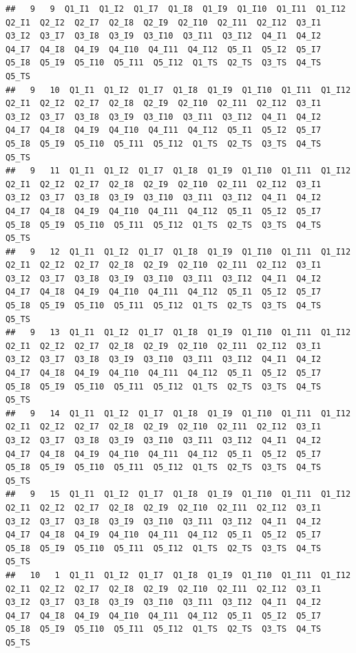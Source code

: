 \documentclass[
]{book}
\begin{document}
\begin{verbatim}
##   9   9  Q1_I1  Q1_I2  Q1_I7  Q1_I8  Q1_I9  Q1_I10  Q1_I11  Q1_I12  Q2_I1  Q2_I2  Q2_I7  Q2_I8  Q2_I9  Q2_I10  Q2_I11  Q2_I12  Q3_I1  Q3_I2  Q3_I7  Q3_I8  Q3_I9  Q3_I10  Q3_I11  Q3_I12  Q4_I1  Q4_I2  Q4_I7  Q4_I8  Q4_I9  Q4_I10  Q4_I11  Q4_I12  Q5_I1  Q5_I2  Q5_I7  Q5_I8  Q5_I9  Q5_I10  Q5_I11  Q5_I12  Q1_TS  Q2_TS  Q3_TS  Q4_TS  Q5_TS
##   9   10  Q1_I1  Q1_I2  Q1_I7  Q1_I8  Q1_I9  Q1_I10  Q1_I11  Q1_I12  Q2_I1  Q2_I2  Q2_I7  Q2_I8  Q2_I9  Q2_I10  Q2_I11  Q2_I12  Q3_I1  Q3_I2  Q3_I7  Q3_I8  Q3_I9  Q3_I10  Q3_I11  Q3_I12  Q4_I1  Q4_I2  Q4_I7  Q4_I8  Q4_I9  Q4_I10  Q4_I11  Q4_I12  Q5_I1  Q5_I2  Q5_I7  Q5_I8  Q5_I9  Q5_I10  Q5_I11  Q5_I12  Q1_TS  Q2_TS  Q3_TS  Q4_TS  Q5_TS
##   9   11  Q1_I1  Q1_I2  Q1_I7  Q1_I8  Q1_I9  Q1_I10  Q1_I11  Q1_I12  Q2_I1  Q2_I2  Q2_I7  Q2_I8  Q2_I9  Q2_I10  Q2_I11  Q2_I12  Q3_I1  Q3_I2  Q3_I7  Q3_I8  Q3_I9  Q3_I10  Q3_I11  Q3_I12  Q4_I1  Q4_I2  Q4_I7  Q4_I8  Q4_I9  Q4_I10  Q4_I11  Q4_I12  Q5_I1  Q5_I2  Q5_I7  Q5_I8  Q5_I9  Q5_I10  Q5_I11  Q5_I12  Q1_TS  Q2_TS  Q3_TS  Q4_TS  Q5_TS
##   9   12  Q1_I1  Q1_I2  Q1_I7  Q1_I8  Q1_I9  Q1_I10  Q1_I11  Q1_I12  Q2_I1  Q2_I2  Q2_I7  Q2_I8  Q2_I9  Q2_I10  Q2_I11  Q2_I12  Q3_I1  Q3_I2  Q3_I7  Q3_I8  Q3_I9  Q3_I10  Q3_I11  Q3_I12  Q4_I1  Q4_I2  Q4_I7  Q4_I8  Q4_I9  Q4_I10  Q4_I11  Q4_I12  Q5_I1  Q5_I2  Q5_I7  Q5_I8  Q5_I9  Q5_I10  Q5_I11  Q5_I12  Q1_TS  Q2_TS  Q3_TS  Q4_TS  Q5_TS
##   9   13  Q1_I1  Q1_I2  Q1_I7  Q1_I8  Q1_I9  Q1_I10  Q1_I11  Q1_I12  Q2_I1  Q2_I2  Q2_I7  Q2_I8  Q2_I9  Q2_I10  Q2_I11  Q2_I12  Q3_I1  Q3_I2  Q3_I7  Q3_I8  Q3_I9  Q3_I10  Q3_I11  Q3_I12  Q4_I1  Q4_I2  Q4_I7  Q4_I8  Q4_I9  Q4_I10  Q4_I11  Q4_I12  Q5_I1  Q5_I2  Q5_I7  Q5_I8  Q5_I9  Q5_I10  Q5_I11  Q5_I12  Q1_TS  Q2_TS  Q3_TS  Q4_TS  Q5_TS
##   9   14  Q1_I1  Q1_I2  Q1_I7  Q1_I8  Q1_I9  Q1_I10  Q1_I11  Q1_I12  Q2_I1  Q2_I2  Q2_I7  Q2_I8  Q2_I9  Q2_I10  Q2_I11  Q2_I12  Q3_I1  Q3_I2  Q3_I7  Q3_I8  Q3_I9  Q3_I10  Q3_I11  Q3_I12  Q4_I1  Q4_I2  Q4_I7  Q4_I8  Q4_I9  Q4_I10  Q4_I11  Q4_I12  Q5_I1  Q5_I2  Q5_I7  Q5_I8  Q5_I9  Q5_I10  Q5_I11  Q5_I12  Q1_TS  Q2_TS  Q3_TS  Q4_TS  Q5_TS
##   9   15  Q1_I1  Q1_I2  Q1_I7  Q1_I8  Q1_I9  Q1_I10  Q1_I11  Q1_I12  Q2_I1  Q2_I2  Q2_I7  Q2_I8  Q2_I9  Q2_I10  Q2_I11  Q2_I12  Q3_I1  Q3_I2  Q3_I7  Q3_I8  Q3_I9  Q3_I10  Q3_I11  Q3_I12  Q4_I1  Q4_I2  Q4_I7  Q4_I8  Q4_I9  Q4_I10  Q4_I11  Q4_I12  Q5_I1  Q5_I2  Q5_I7  Q5_I8  Q5_I9  Q5_I10  Q5_I11  Q5_I12  Q1_TS  Q2_TS  Q3_TS  Q4_TS  Q5_TS
##   10   1  Q1_I1  Q1_I2  Q1_I7  Q1_I8  Q1_I9  Q1_I10  Q1_I11  Q1_I12  Q2_I1  Q2_I2  Q2_I7  Q2_I8  Q2_I9  Q2_I10  Q2_I11  Q2_I12  Q3_I1  Q3_I2  Q3_I7  Q3_I8  Q3_I9  Q3_I10  Q3_I11  Q3_I12  Q4_I1  Q4_I2  Q4_I7  Q4_I8  Q4_I9  Q4_I10  Q4_I11  Q4_I12  Q5_I1  Q5_I2  Q5_I7  Q5_I8  Q5_I9  Q5_I10  Q5_I11  Q5_I12  Q1_TS  Q2_TS  Q3_TS  Q4_TS  Q5_TS

\end{verbatim}
\end{document}
